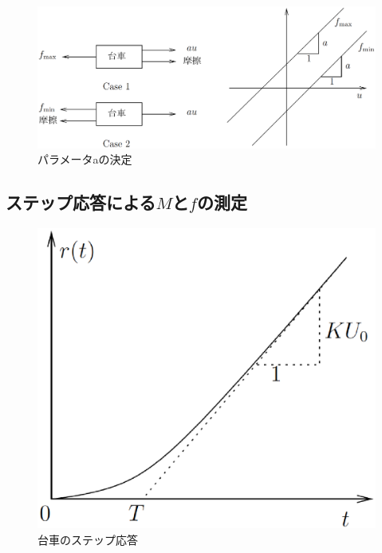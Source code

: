 \documentclass[a4j,11pt,twoside]{jbook}
\begin{document}
\begin{figure}[htbp]
	\begin{center}
		\includegraphics[width = 0.8 \linewidth]{definition_a.eps}
		\caption{パラメータaの決定}
		\label{fig:パラメータaの決定}
	\end{center}
\end{figure}

\subsection{ステップ応答による$M$と$f$の測定}

\begin{figure}[htbp]
	\begin{center}
		\includegraphics[width = 0.6 \linewidth]{cart_step.eps}
		\caption{台車のステップ応答}
		\label{fig:台車のステップ応答}
	\end{center}
\end{figure}
\end{document}

